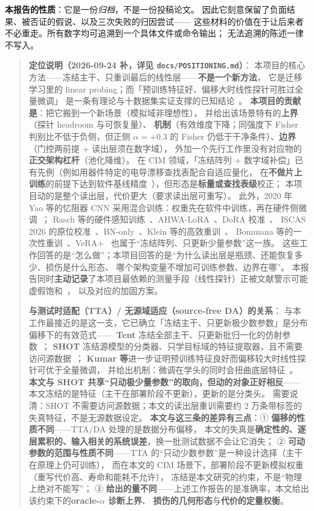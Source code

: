 \documentclass[11pt,a4paper]{ctexart}
\begin{document}
\textbf{本报告的性质}：它是一份\emph{归档}，不是一份投稿论文。
因此它刻意保留了负面结果、被否证的假说、以及三次失败的归因尝试——
这些材料的价值在于让后来者不必重走。所有数字均可追溯到一个具体文件或命令输出；
无法追溯的陈述一律不写入。

\begin{quote}
\textbf{定位说明（2026-09-24 补，详见 \texttt{docs/POSITIONING.md}）}：
本项目的核心方法——冻结主干、只重训最后的线性层——\textbf{不是一个新方法}，
它是迁移学习里的 linear probing；而「预训练特征好、偏移大时线性探针可胜过全量微调」
是一条有理论与十数据集实证支撑的已知结论~\cite{lpft}。
\textbf{本项目的贡献是}：把它搬到一个新场景（模拟域非理想性），
并给出该场景特有的\textbf{上界}（探针 headroom 与可恢复量）、
\textbf{机制}（有效维度下降；同强度下 Fisher 判别比不低于负侧，但正侧 $\alpha=+0.3$ 的 Fisher 仍低于干净条件）、\textbf{边界}（门控两前提 + 读出层须在数字域），
外加一个先行工作里没有对应物的\textbf{正交架构杠杆}（池化降维）。
在 CIM 领域，「冻结阵列 + 数字域补偿」已有先例（例如用器件特定的电导漂移查找表配合自适应量化，
在\textbf{不做片上训练}的前提下达到软件基线精度~\cite{mtjcal}），但形态是\textbf{标量或查找表级}校正；
本项目动的是整个读出层，代价更大（要求读出层可重写）。
此外，2020 年 Yao 等的忆阻器 CNN 采用混合训练：权重先在软件中训练，再在硬件侧微调~\cite{yao2020}；
Rasch 等的硬件感知训练~\cite{rasch2023}、AHWA-LoRA~\cite{ahwa_lora}、DoRA 校准~\cite{dora}、
ISCAS 2026 的原位校准~\cite{kong2026}、BN-only~\cite{bn_only}、Klein 等的高效重训~\cite{klein2021}、
Bommana 等的一次性重训~\cite{bommana2026}、VeRA+~\cite{vera} 也属于“冻结阵列、只更新少量参数”这一族。
这些工作回答的是“怎么做”；本项目回答的是“为什么读出层是瓶颈、还能恢复多少、损伤是什么形态、
哪个架构变量不增加可训练参数、边界在哪”。
本报告同时\textbf{主动记录}了本项目最依赖的测量手段（线性探针）正被文献警示可能虚假饱和~\cite{gjepa}，
以及对应的加固方案。

\textbf{与测试时适配（TTA）/ 无源域适应（source-free DA）的关系}：
与本工作最接近的是这一支，它已确立「冻结主干、只更新极少数参数」是分布偏移下的有效范式——
\textbf{Tent} 冻结全部主干、只更新批归一化的仿射参数~\cite{tent}；
\textbf{SHOT} 冻结源模型的分类器、只学目标域的特征提取器，且不需要访问源数据~\cite{shot}；
\textbf{Kumar 等}进一步证明预训练特征良好而偏移较大时线性探针可优于全量微调，
并给出机制：微调在学头的同时会扭曲底层特征~\cite{lpft}。
\textbf{本文与 SHOT 共享“只动极少量参数”的取向，但动的对象正好相反}——
本文冻结的是特征（主干在部署阶段不更新），更新的是分类头。
需要说清：SHOT 不需要访问源数据；本文的读出层重训需要约 2 万条带标签的失真特征，不是无源数据设定。
\textbf{本文与这三条的差异有三点}：① \textbf{偏移的性质不同}——TTA/DA 处理的是数据分布偏移，
本文的失真是\textbf{确定性的、逐层累积的、输入相关的系统误差}，换一批测试数据不会让它消失；
② \textbf{可动参数的范围与性质不同}——TTA 的“只动少数参数”是一种设计选择（主干在原理上仍可训练），
而在本文的 CIM 场景下，部署阶段不更新模拟权重（重写代价高、寿命和能耗不允许），
冻结是本文研究的约束，不是“物理上绝对不能写”；
③ \textbf{给出的量不同}——上述工作报告的是准确率，本文给出该约束下的\textbf{oracle-$\alpha$ 诊断上界}、
\textbf{损伤的几何形态}与\textbf{代价的定量权衡}。
\end{quote}
\end{document}
